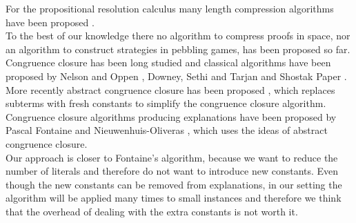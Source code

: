 For the propositional resolution calculus many length compression algorithms have been proposed \cite{TODO: quote all the algorithms}.\\
To the best of our knowledge there no algorithm to compress proofs in space, nor an algorithm to construct strategies in pebbling games, has been proposed so far.\\
Congruence closure has been long studied and classical algorithms have been proposed by Nelson and Oppen \cite{TODO: Nelson-Oppen paper}, Downey, Sethi and Tarjan \cite{TODO: DST Paper} and Shostak Paper \cite{TODO: Shostak paper}. %
More recently abstract congruence closure has been proposed \cite{TODO:Abstract Congruence Closure and Specializations paper}, which replaces subterms with fresh constants to simplify the congruence closure algorithm.\\
Congruence closure algorithms producing explanations have been proposed by Pascal Fontaine \cite{TODO: Pascals Thesis} and Nieuwenhuis-Oliveras \cite{TODO: BarceLogic CC paper}, which uses the ideas of abstract congruence closure.\\
Our approach is closer to Fontaine's algorithm, because we want to reduce the number of literals and therefore do not want to introduce new constants.
Even though the new constants can be removed from explanations, in our setting the algorithm will be applied many times to small instances and therefore we think that the overhead of dealing with the extra constants is not worth it.